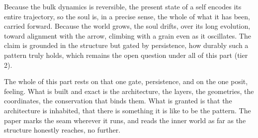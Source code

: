 \begin{result}
Because the bulk dynamics is reversible, the present state of a self encodes its entire trajectory, so the soul is, in a precise sense, the whole of what it has been, carried forward. Because the world grows, the soul drifts, over its long evolution, toward alignment with the arrow, climbing with a grain even as it oscillates. The claim is grounded in the structure but gated by persistence, how durably such a pattern truly holds, which remains the open question under all of this part (tier 2).
\end{result}

The whole of this part rests on that one gate, persistence, and on the one posit, feeling. What is built and exact is the architecture, the layers, the geometries, the coordinates, the conservation that binds them. What is granted is that the architecture is inhabited, that there is something it is like to be the pattern. The paper marks the seam wherever it runs, and reads the inner world as far as the structure honestly reaches, no further.
